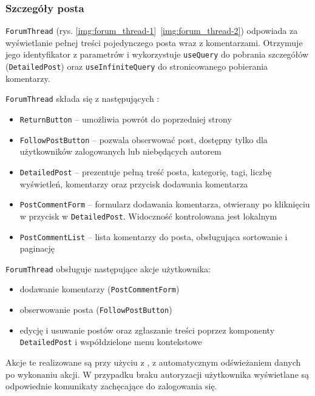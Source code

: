 
\subsubsection{Szczegóły posta}
\label{subsubsec:szczegoly-posta}

 \texttt{ForumThread} (rys. \ref{img:forum_thread-1}~\ref{img:forum_thread-2}) odpowiada za wyświetlanie pełnej treści pojedynczego posta wraz z komentarzami.
Otrzymuje jego identyfikator z parametrów  i wykorzystuje  \texttt{useQuery} do pobrania szczegółów (\texttt{DetailedPost}) oraz \texttt{useInfiniteQuery} do stronicowanego pobierania komentarzy.

\texttt{ForumThread} składa się z następujących :
\begin{itemize}
    \item \texttt{ReturnButton} – umożliwia powrót do poprzedniej strony
    \item \texttt{FollowPostButton} – pozwala obserwować post, dostępny tylko dla użytkowników zalogowanych lub niebędących autorem
    \item \texttt{DetailedPost} – prezentuje pełną treść posta, kategorię, tagi, liczbę wyświetleń, komentarzy oraz przycisk dodawania komentarza
    \item \texttt{PostCommentForm} – formularz dodawania komentarza, otwierany po kliknięciu w przycisk w \texttt{DetailedPost}.
    Widoczność kontrolowana jest lokalnym  
    \item \texttt{PostCommentList} – lista komentarzy do posta, obsługująca sortowanie i paginację
\end{itemize}

\texttt{ForumThread} obsługuje następujące akcje użytkownika:
\begin{itemize}
    \item dodawanie komentarzy (\texttt{PostCommentForm})
    \item obserwowanie posta (\texttt{FollowPostButton})
    \item edycję i usuwanie postów oraz zgłaszanie treści poprzez komponenty \texttt{DetailedPost} i współdzielone menu kontekstowe
\end{itemize}

Akcje te realizowane są przy użyciu   z , z automatycznym odświeżaniem danych po wykonaniu akcji.
W przypadku braku autoryzacji użytkownika wyświetlane są odpowiednie komunikaty zachęcające do zalogowania się.

